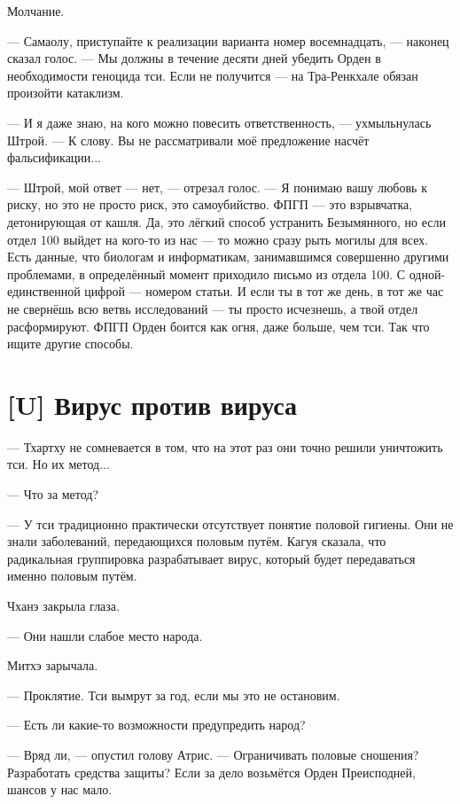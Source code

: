 Молчание.

--- Самаолу, приступайте к реализации варианта номер восемнадцать, --- наконец сказал голос.
--- Мы должны в течение десяти дней убедить Орден в необходимости геноцида тси.
Если не получится --- на Тра-Ренкхале обязан произойти катаклизм.

--- И я даже знаю, на кого можно повесить ответственность, --- ухмыльнулась Штрой.
--- К слову.
Вы не рассматривали моё предложение насчёт фальсификации...

--- Штрой, мой ответ --- нет, --- отрезал голос.
--- Я понимаю вашу любовь к риску, но это не просто риск, это самоубийство.
ФПГП --- это взрывчатка, детонирующая от кашля.
Да, это лёгкий способ устранить Безымянного, но если отдел 100 выйдет на кого-то из нас --- то можно сразу рыть могилы для всех.
Есть данные, что биологам и информатикам, занимавшимся совершенно другими проблемами, в определённый момент приходило письмо из отдела 100.
С одной-единственной цифрой --- номером статьи.
И если ты в тот же день, в тот же час не свернёшь всю ветвь исследований --- ты просто исчезнешь, а твой отдел расформируют.
ФПГП Орден боится как огня, даже больше, чем тси.
Так что ищите другие способы.

\section{[U] Вирус против вируса}

\textspace

--- Тхартху не сомневается в том, что на этот раз они точно решили уничтожить тси.
Но их метод...

--- Что за метод?

--- У тси традиционно практически отсутствует понятие половой гигиены.
Они не знали заболеваний, передающихся половым путём.
Кагуя сказала, что радикальная группировка разрабатывает вирус, который будет передаваться именно половым путём.

Чханэ закрыла глаза.

--- Они нашли слабое место народа.

Митхэ зарычала.

--- Проклятие.
Тси вымрут за год, если мы это не остановим.

--- Есть ли какие-то возможности предупредить народ?

--- Вряд ли, --- опустил голову Атрис.
--- Ограничивать половые сношения?
Разработать средства защиты?
Если за дело возьмётся Орден Преисподней, шансов у нас мало.

